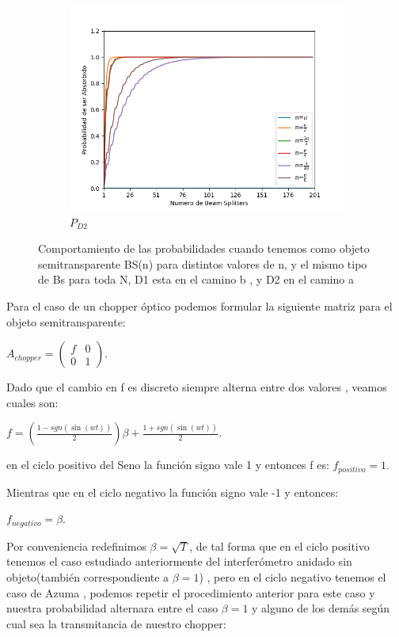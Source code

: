 \documentclass[11pt]{article}
\begin{document}
\begin{figure}[h!]
\begin{subfigure}[b]{0.45\linewidth}
\includegraphics[width=\linewidth]{BsFijo_azumaabs.png}
\caption{$P_{D2}$}
\label{fig:BS1}
\end{subfigure}
\caption{Comportamiento de las probabilidades cuando tenemos como objeto semitransparente BS(n) para distintos valores de n, y el mismo tipo de Bs para toda N, D1 esta en el camino b , y D2 en el camino a}
\label{fig:westminster}
\end{figure} 

Para el caso de un chopper óptico podemos formular la siguiente matriz para el objeto semitransparente:

$A_{chopper}=\begin{pmatrix} f & 0 \\ 0 & 1 \end{pmatrix}$.

Dado que el cambio en f es discreto siempre alterna entre dos valores , veamos cuales son:


$f=\left(\frac{1-sgn(\sin(wt))}{2} \right)\beta+\frac{1+sgn(\sin(wt))}{2}$.

en el ciclo positivo del Seno la función signo vale 1 y entonces f es:
$f_{positivo}=1$.

Mientras que en el ciclo negativo la función signo vale -1 y entonces:

$f_{negativo}=\beta$.

Por conveniencia redefinimos $\beta=\sqrt{T}$, de tal forma que en el ciclo positivo tenemos el caso estudiado anteriormente del interferómetro anidado sin objeto(también correspondiente a $\beta=1$) , pero en el ciclo negativo tenemos el caso de Azuma , podemos repetir el procedimiento anterior para este caso y nuestra probabilidad alternara entre el caso $\beta=1$ y alguno de los demás según cual sea la transmitancia de nuestro chopper:
\end{document}
